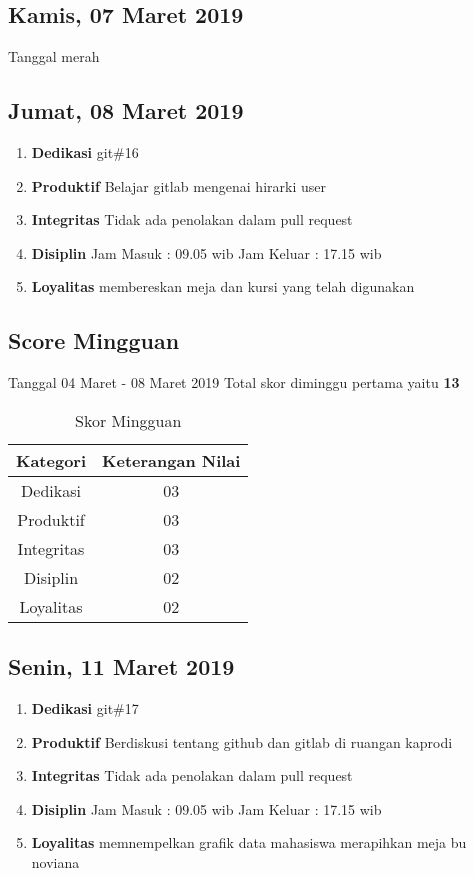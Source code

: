 \subsection{Kamis, 07 Maret 2019}
Tanggal merah

\subsection{Jumat, 08 Maret 2019}
\begin{enumerate}
\item \textbf{Dedikasi}
\subitem git\#16
\item \textbf{Produktif}
\subitem Belajar gitlab mengenai hirarki user 
\item \textbf{Integritas}
\subitem Tidak ada penolakan dalam pull request
\item \textbf{Disiplin}
\subitem Jam Masuk : 09.05 wib
\subitem Jam Keluar : 17.15 wib
\item \textbf{Loyalitas}
\subitem membereskan meja dan kursi yang telah digunakan
\end{enumerate}

\subsection{Score Mingguan} 
Tanggal 04 Maret - 08 Maret 2019 Total skor diminggu pertama yaitu \textbf{13}

\begin{table}[h]
\caption{Skor Mingguan}
\centering
\begin{tabular}{|c|c|}
\hline
\textbf{Kategori}&\textbf{Keterangan Nilai}\\
\hline
Dedikasi&03\\
\hline
Produktif&03\\
\hline
Integritas&03\\
\hline
Disiplin&02\\
\hline
Loyalitas&02\\
\hline
\end{tabular}
\label{table : skor minggu kedua}
\end{table}

\subsection{Senin, 11 Maret 2019}
\begin{enumerate}
\item \textbf{Dedikasi}
\subitem git\#17
\item \textbf{Produktif}
\subitem Berdiskusi tentang github dan gitlab di ruangan kaprodi 
\item \textbf{Integritas}
\subitem Tidak ada penolakan dalam pull request
\item \textbf{Disiplin}
\subitem Jam Masuk : 09.05 wib
\subitem Jam Keluar : 17.15 wib
\item \textbf{Loyalitas}
\subitem memnempelkan grafik data mahasiswa
\subitem merapihkan meja bu noviana
\end{enumerate}